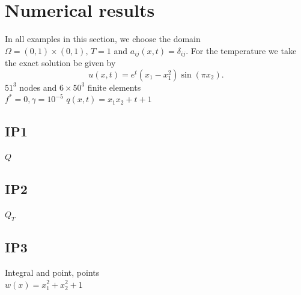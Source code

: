 \documentclass[]{article}
\begin{document}
\section{Numerical results}
In all examples in this section, we choose the domain $\Omega=(0, 1)\times(0, 1),\, T=1$ and $a_{ij}(x, t)=\delta_{ij}$.
For the temperature we take the exact solution be given by
$$u(x, t)=e^t(x_1-x_1^2)\sin(\pi x_2).$$
$51^3$ nodes and $6\times 50^3$ finite elements\\
$f^*=0, \gamma=10^{-5}$
$q(x, t)=x_1x_2+t+1$
\subsection{IP1}
$Q$
\subsection{IP2}
$Q_T$
\subsection{IP3}
Integral and point, points\\
$w(x)=x_1^2+x_2^2+1$
\end{document}
